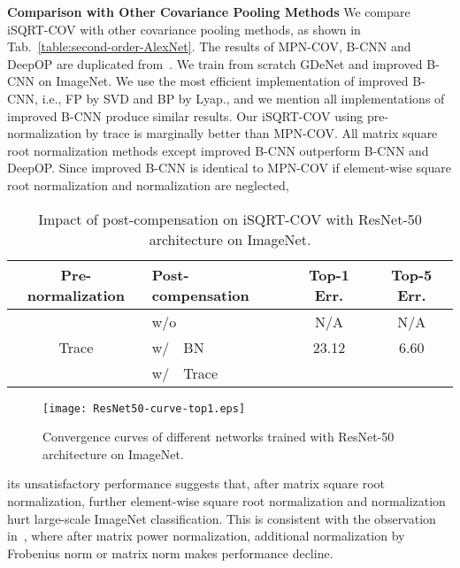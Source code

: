 \documentclass[10pt,twocolumn,letterpaper]{article}
\begin{document}
\vspace{4pt}\noindent\textbf{Comparison with Other Covariance Pooling Methods}\quad 
We compare iSQRT-COV  with other covariance pooling methods, as shown in Tab.~\ref{table:second-order-AlexNet}. The results of MPN-COV, B-CNN and DeepOP are duplicated from~\cite{Li_2017_ICCV}. We train from scratch  GDeNet and improved B-CNN  on ImageNet. We use the most efficient implementation  of improved B-CNN, i.e., FP by SVD and BP by Lyap., and we mention all implementations of improved B-CNN produce similar results. Our iSQRT-COV using pre-normalization by trace is marginally better than  MPN-COV.  All  matrix square root normalization methods  except improved B-CNN outperform  B-CNN and DeepOP. Since  improved B-CNN is identical to MPN-COV if element-wise square root  normalization and normalization are neglected, 
\begin{table}[t]
\setlength\tabcolsep{4pt}
	\renewcommand{\baselinestretch}{1.05}
\footnotesize
	\centering
\begin{minipage}[t]{1.0\linewidth}
		\centering
		\begin{tabular}{|c|l|c|c|}
			\hline
			Pre-normalization & Post-compensation & Top-1 Err.   &  Top-5 Err. \\
			\hline
			\hline
			\multirow{3}{*}{Trace} & w/o       &   N/A    & N/A     \\
			& w/~~BN~\cite{DBLP:journals/corr/IoffeS15}       &  23.12     & 6.60     \\
			& w/~~Trace        &   &  \\
			\hline
		\end{tabular}
	\end{minipage}
	\renewcommand{\baselinestretch}{1.0}
	\caption{Impact of post-compensation on iSQRT-COV  with  ResNet-50 architecture on ImageNet.}
	\label{table:Post-compensation}
\end{table}
\begin{figure}[t]
	\setlength\tabcolsep{4pt}
	\footnotesize
	\centering
\begin{minipage}[b]{0.7\linewidth}
		\centering
		\texttt{[image: ResNet50-curve-top1.eps]}
	\end{minipage}
	\caption{Convergence curves of different networks trained  with ResNet-50 architecture on ImageNet.}
	\label{figure:traing-iSQRT-COV}
\end{figure}
its unsatisfactory performance  suggests that,  after matrix square root normalization, further element-wise square root normalization and normalization hurt large-scale ImageNet classification. This is consistent with the observation in~\cite[Tab. 1]{Li_2017_ICCV}, where after matrix power normalization,  additional normalization by Frobenius norm or matrix norm makes performance decline. 
\end{document}
